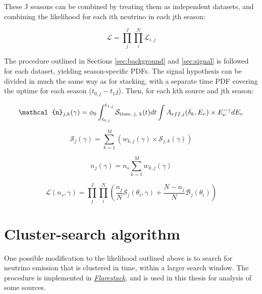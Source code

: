 These J seasons can be combined by treating them as independent datasets, and combining the likelihood for each ith neutrino in each jth season:

\begin{equation}
\mathcal{L} = \prod_{j}^{J}\prod_{i}^{N} \mathcal{L}_{i, j}
\end{equation}

The procedure outlined in Sections \ref{sec:background} and \ref{sec:signal} is followed for each dataset, yielding season-specific PDFs. The signal hypothesis can be divided in much the same way as for stacking, with a separate time PDF covering the uptime for each season ($t_{0, j} - t_1{j}$). Then, for each kth source and jth season:

\begin{equation}
\mathcal{n}_{j, k} (\gamma) = \phi_{0} \int_{t_{0, j}}^{t_{1,j}} \mathcal{S}_{\textup{time, j, k}}(t) dt \int A_{eff, j}(\delta_{k}, E_{\nu}) \times E_{\nu}^{-\gamma} dE_{\nu}
\label{eq:n_k_full}
\end{equation}

\begin{equation}
\mathcal{S}_{j}(\gamma) = \sum^{M}_{k=1} \left( w_{k, j}(\gamma)  \times \mathcal{S}_{j, k}(\gamma)  \right)
\label{eq:S_stacked_season}
\end{equation}

\begin{equation}
n_{j}(\gamma) = n_{s} \sum^{M}_{k=1} w_{k, j}(\gamma)
\label{eq:n_j}
\end{equation}

\begin{equation}
\mathcal{L}(n_{s}, \gamma) = \prod_{j}^{J} \prod_{i}^{N} \left(\frac{n_{j}}{N} \mathcal{S}_{j}(\theta_{i}, \gamma) + \frac{N - n_{j}}{N} \mathcal{B}_{j}(\theta_{i})  \right)
\label{eq:ps_llh_seasons}
\end{equation}

\section{Cluster-search algorithm}
\label{sec:cluster_algorithm}

One possible modification to the likelihood outlined above is to search for neutrino emission that is clustered in time, within a larger search window. The procedure is implemented in \emph{\href{https://github.com/IceCubeOpenSource/flarestack}{Flarestack}}, and is used in this thesis for analysis of some sources. 

